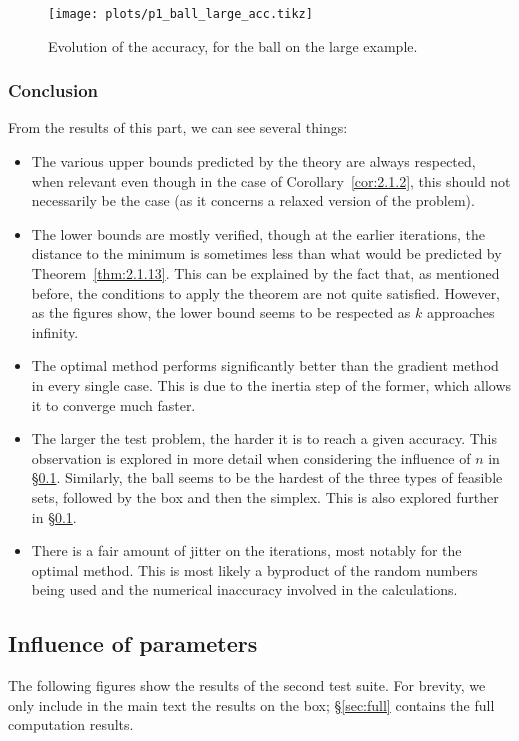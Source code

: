 \documentclass[final]{aomart}
\newtheorem[{}\it]{thm}{Theorem}[section]
\theoremstyle{definition}
\newtheorem*[{}\it]{notation}{Notation}
\numberwithin{equation}{section}
\newcommand{\thmref}[1]{Theorem~\ref{#1}}
\newcommand{\secref}[1]{\S\ref{#1}}
\begin{document}
\begin{figure}[!hbtp]
	\centering
	\texttt{[image: plots/p1\_ball\_large\_acc.tikz]}
	\caption{Evolution of the accuracy, for the ball on the large example.}
	\label{fig:p1_ball_large_acc}
\end{figure}

\subsubsection{Conclusion}
\label{sec:expl1}
From the results of this part, we can see several things:
\begin{itemize}
	\item The various upper bounds predicted by the theory are always respected, when relevant even though in the case of Corollary~\ref{cor:2.1.2}, this should not necessarily be the case (as it concerns a relaxed version of the problem).
	\item The lower bounds are mostly verified, though at the earlier iterations, the distance to the minimum is sometimes less than what would be predicted by \thmref{thm:2.1.13}.
	This can be explained by the fact that, as mentioned before, the conditions to apply the theorem are not quite satisfied.
	However, as the figures show, the lower bound seems to be respected as  \(k\) approaches infinity.
	\item The optimal method performs significantly better than the gradient method in every single case.
	This is due to the inertia step of the former, which allows it to converge much faster.
	\item The larger the test problem, the harder it is to reach a given accuracy.
	This observation is explored in more detail when considering the influence of \(n\) in \secref{sec:param}.
	Similarly, the ball seems to be the hardest of the three types of feasible sets, followed by the box and then the simplex.
	This is also explored further in \secref{sec:param}.
	\item There is a fair amount of jitter on the iterations, most notably for the optimal method.
	This is most likely a byproduct of the random numbers being used and the numerical inaccuracy involved in the calculations.
\end{itemize}

\subsection{Influence of parameters}
\label{sec:param}
The following figures show the results of the second test suite.
For brevity, we only include in the main text the results on the box; \secref{sec:full} contains the full computation results.
\end{document}
